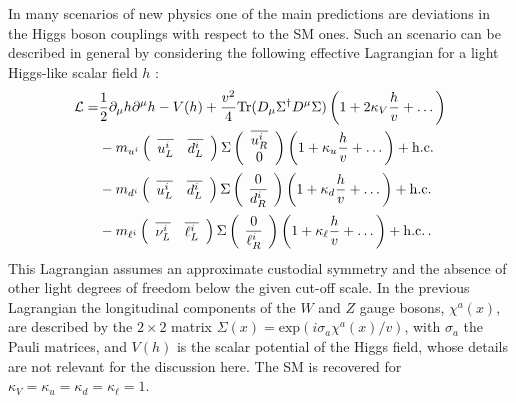 \documentclass[preprint,3p,12pt]{elsarticle}
\begin{document}
{In many scenarios of new physics one of the main predictions are deviations in the Higgs boson couplings with respect to the SM ones. Such an scenario can be described in general by considering the following effective Lagrangian for a light Higgs-like scalar field $h$ \cite{Contino:2010mh,Azatov:2012bz}:
%
\begin{equation}
\begin{split}
{\cal L}=&\frac 12 \partial_\mu h \partial^\mu h - V(h) + \frac{v^2}{4} \mathrm{Tr}(D_\mu \Sigma^\dagger D^\mu\Sigma)\left(1+2\kappa_V\frac{h}{v}+\dots\right)\\
%
&-m_{u^i} \left(\begin{array}{c c}\overline{u_L^i}&\overline{d_L^i}\end{array}\right) \Sigma \left(\begin{array}{c}\overline{u_R^i}\\ 0 \end{array}\right) \left(1+ \kappa_u \frac{h}{v}+\dots \right) +\mathrm{h.c.}\\
%
&-m_{d^i} \left(\begin{array}{c c}\overline{u_L^i}&\overline{d_L^i}\end{array}\right) \Sigma \left(\begin{array}{c}0\\ \overline{d_R^i} \end{array}\right) \left(1+ \kappa_d \frac{h}{v}+\dots \right) +\mathrm{h.c.}\\
%
&-m_{\ell^i} \left(\begin{array}{c c}\overline{\nu_L^i}&\overline{\ell_L^i}\end{array}\right) \Sigma \left(\begin{array}{c} 0\\ \overline{\ell_R^i}\end{array}\right) \left(1+ \kappa_\ell \frac{h}{v}+\dots \right) +\mathrm{h.c.}~\!.
\label{eq:Lagh}
\end{split}
\end{equation}
%
This Lagrangian assumes an approximate custodial symmetry and the absence of other light degrees of freedom below the given cut-off scale. In the previous Lagrangian the longitudinal components of the $W$ and $Z$ gauge bosons, $\chi^a(x)$, are described by the $2\times 2$ matrix $\Sigma(x)=\mathrm{exp}\left( i \sigma_a \chi^a(x)/v\right)$, with $\sigma_a$ the Pauli matrices, and $V(h)$ is the scalar potential of the Higgs field, whose details are not relevant for the discussion here. The SM is recovered for $\kappa_V=\kappa_u=\kappa_d=\kappa_\ell=1$. 

}
\end{document}
